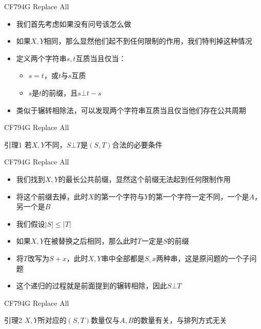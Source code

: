 \documentclass{beamer}
\begin{document}
\begin{frame}{CF794G Replace All}
    \begin{itemize}
        \item 我们首先考虑如果没有问号该怎么做
        \item 如果$X, Y$相同，那么显然他们起不到任何限制的作用，我们特判掉这种情况
        \item 定义两个字符串$s, t$互质当且仅当：
        \begin{itemize}
            \item $s = t$，或$t$与$s$互质
            \item $s$是$t$的前缀，且$s \bot t - s$
        \end{itemize}
        \item 类似于辗转相除法，可以发现两个字符串互质当且仅当他们存在公共周期
    \end{itemize}
\end{frame}

\begin{frame}{CF794G Replace All}
    \begin{block}{引理1}
        若$X, Y$不同，$S\bot T$是$(S, T)$合法的必要条件
    \end{block}
\end{frame}

\begin{frame}{CF794G Replace All}
    \begin{itemize}
        \item 我们找到$X, Y$的最长公共前缀，显然这个前缀无法起到任何限制作用
        \item 将这个前缀去掉，此时$X$的第一个字符与$Y$的第一个字符一定不同，一个是$A$，另一个是$B$
        \item 我们假设$|S|\leq |T|$
        \item 如果$X, Y$在被替换之后相同，那么此时$T$一定是$S$的前缀
        \item 将$T$改写为$S + x$，此时$X, Y$串中全部都是$S, x$两种串，这是原问题的一个子问题
        \item 这个递归的过程就是前面提到的辗转相除，因此$S\bot T$
    \end{itemize}
\end{frame}

\begin{frame}{CF794G Replace All}
    \begin{block}{引理2}
        $X, Y$所对应的$(S, T)$数量仅与$A, B$的数量有关，与排列方式无关
    \end{block}
\end{frame}
\end{document}
